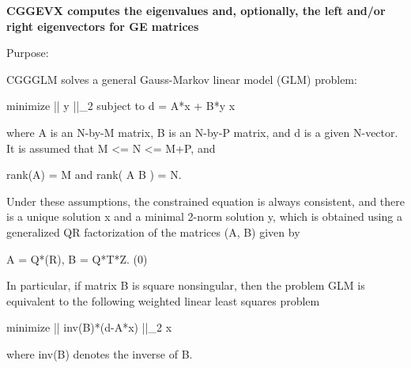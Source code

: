 {\bfseries  C\+G\+G\+E\+V\+X computes the eigenvalues and, optionally, the left and/or right eigenvectors for G\+E matrices} 

 \begin{DoxyParagraph}{Purpose\+: }
\begin{DoxyVerb} CGGGLM solves a general Gauss-Markov linear model (GLM) problem:

         minimize || y ||_2   subject to   d = A*x + B*y
             x

 where A is an N-by-M matrix, B is an N-by-P matrix, and d is a
 given N-vector. It is assumed that M <= N <= M+P, and

            rank(A) = M    and    rank( A B ) = N.

 Under these assumptions, the constrained equation is always
 consistent, and there is a unique solution x and a minimal 2-norm
 solution y, which is obtained using a generalized QR factorization
 of the matrices (A, B) given by

    A = Q*(R),   B = Q*T*Z.
          (0)

 In particular, if matrix B is square nonsingular, then the problem
 GLM is equivalent to the following weighted linear least squares
 problem

              minimize || inv(B)*(d-A*x) ||_2
                  x

 where inv(B) denotes the inverse of B.\end{DoxyVerb}
 
\end{DoxyParagraph}

